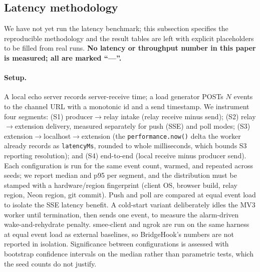 \documentclass[11pt]{article}
\begin{document}
\subsection{Latency methodology}
\label{sec:latency}

We have not yet run the latency benchmark; this subsection specifies the
reproducible methodology and the result tables are left with explicit
placeholders to be filled from real runs. \textbf{No latency or throughput
number in this paper is measured; all are marked ``---''.}

\paragraph{Setup.} A local echo server records server-receive time; a load
generator POSTs $N$ events to the channel URL with a monotonic id and a send
timestamp. We instrument four segments: (S1) producer$\rightarrow$relay intake
(relay receive minus send); (S2) relay$\rightarrow$extension delivery, measured
separately for push (SSE) and poll modes; (S3)
extension$\rightarrow$localhost$\rightarrow$extension (the
\texttt{performance.now()} delta the worker already records as
\texttt{latencyMs}, rounded to whole milliseconds, which bounds S3 reporting
resolution); and (S4) end-to-end (local receive minus producer send).
Each configuration is run for the same event count, warmed, and repeated across
seeds; we report median and p95 per segment, and the distribution must be
stamped with a hardware/region fingerprint (client OS, browser build, relay
region, Neon region, git commit). Push and poll are compared at equal event
load to isolate the SSE latency benefit. A cold-start variant deliberately
idles the MV3 worker until termination, then sends one event, to measure the
alarm-driven wake-and-rehydrate penalty. smee-client and ngrok are run on the
same harness at equal event load as external baselines, so BridgeHook's numbers
are not reported in isolation. Significance between configurations is assessed
with bootstrap confidence intervals on the median rather than parametric tests,
which the seed counts do not justify.
\end{document}
